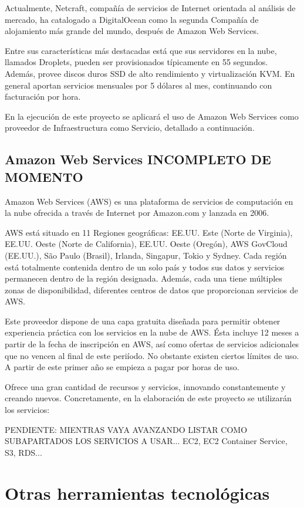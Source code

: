 Actualmente, Netcraft, compañía de servicios de Internet orientada al análisis de mercado, ha catalogado a DigitalOcean como la segunda Compañía de alojamiento más grande del mundo, después de Amazon Web Services.

Entre sus características más destacadas está que sus servidores en la nube, llamados Droplets, pueden ser provisionados típicamente en 55 segundos. Además, provee discos duros SSD de alto rendimiento y virtualización KVM. En general aportan servicios mensuales por 5 dólares al mes, continuando con facturación por hora.

En la ejecución de este proyecto se aplicará el uso de Amazon Web Services como proveedor de Infraestructura como Servicio, detallado a continuación.

\subsection{Amazon Web Services INCOMPLETO DE MOMENTO}

Amazon Web Services (AWS) es una plataforma de servicios de computación en la nube ofrecida a través de Internet por Amazon.com y lanzada en 2006.

AWS está situado en 11 Regiones geográficas: EE.UU. Este (Norte de Virginia), EE.UU. Oeste (Norte de California), EE.UU. Oeste (Oregón), AWS GovCloud (EE.UU.), São Paulo (Brasil), Irlanda, Singapur, Tokio y Sydney. Cada región está totalmente contenida dentro de un solo país y todos sus datos y servicios permanecen dentro de la región designada. Además, cada una tiene múltiples zonas de disponibilidad, diferentes centros de datos que proporcionan servicios de AWS.

Este proveedor dispone de una capa gratuita diseñada para permitir obtener experiencia práctica con los servicios en la nube de AWS. Ésta incluye 12 meses a partir de la fecha de inscripción en AWS, así como ofertas de servicios adicionales que no vencen al final de este periíodo. No obstante existen ciertos límites de uso. A partir de este primer año se empieza a pagar por horas de uso.

Ofrece una gran cantidad de recursos y servicios, innovando constantemente y creando nuevos. Concretamente, en la elaboración de este proyecto se utilizarán los servicios:

PENDIENTE: MIENTRAS VAYA AVANZANDO LISTAR COMO SUBAPARTADOS LOS SERVICIOS A USAR... EC2, EC2 Container Service, S3, RDS...

\section{Otras herramientas tecnológicas}


